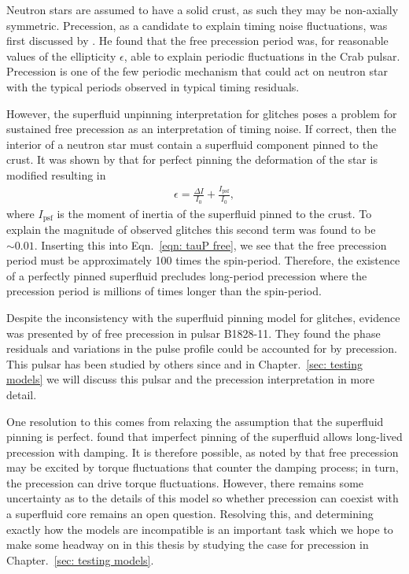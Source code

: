 Neutron stars are assumed to have a solid crust, as such they may be
non-axially symmetric. Precession, as a candidate to explain timing noise
fluctuations, was first discussed by \citet{Ruderman1970}. He found that the
free precession period was, for reasonable values of the  ellipticity
$\epsilon$, able to explain periodic fluctuations in the Crab pulsar.
Precession is one of the few periodic mechanism that could act on neutron star
with the typical periods observed in typical timing residuals.

However, the superfluid unpinning interpretation for glitches poses a problem for
sustained free precession as an interpretation of timing noise. If correct,
then the interior of a neutron star must contain a superfluid component pinned
to the crust. It was shown by \citet{Shaham1977} that for perfect pinning the
deformation of the star is modified resulting in
\begin{align}
\epsilon = \frac{\Delta I}{I_0} + \frac{I_{\textrm{psf}}}{I_0},
\end{align}
where $I_\textrm{psf}$ is the moment of inertia of the superfluid pinned to the
crust. To explain the magnitude of observed glitches this second term was found
to be $\sim 0.01$. Inserting this into Eqn.~\eqref{eqn: tauP free}, we see that
the free precession period must be approximately 100 times the spin-period. Therefore,
the existence of a perfectly pinned superfluid precludes long-period precession
where the precession period is millions of times longer than the spin-period.

Despite the inconsistency with the superfluid pinning model for glitches,
evidence was presented by \citet{Stairs2000} of free precession in pulsar
B1828-11. They found the phase residuals and variations in the pulse profile
could be accounted for by precession. This pulsar has been studied by others
since and in Chapter.~\ref{sec: testing models} we will discuss this pulsar and
the precession interpretation in more detail.

One resolution to this comes from relaxing the assumption that the superfluid
pinning is perfect. \citet{Sedrakian1999} found that imperfect pinning of the
superfluid allows long-lived precession with damping. It is therefore possible,
as noted by \citet{Cordes1993} that free precession may be excited by torque
fluctuations that counter the damping process; in turn, the precession can
drive torque fluctuations. However, there remains some uncertainty as to the
details of this model so whether precession can coexist with a superfluid core
remains an open question. Resolving this, and determining exactly how the
models are incompatible is an important task which we hope to make some headway
on in this thesis by studying the case for precession in Chapter.~\ref{sec:
testing models}.


